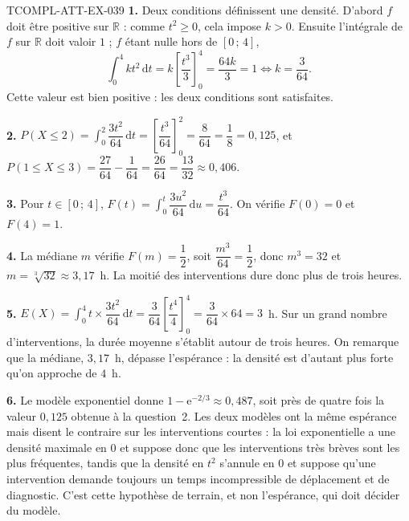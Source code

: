 \begin{corrige}{TCOMPL-ATT-EX-039}
\textbf{1.} Deux conditions définissent une densité. D'abord $f$ doit être
positive sur $\mathbb{R}$ : comme $t^2\geqslant 0$, cela impose $k>0$. Ensuite
l'intégrale de $f$ sur $\mathbb{R}$ doit valoir $1$ ; $f$ étant nulle hors de
$[0\,;\,4]$,
\[
  \int_0^4 k t^2\,\mathrm{d}t=k\left[\dfrac{t^3}{3}\right]_0^4=\dfrac{64k}{3}=1
  \iff k=\dfrac{3}{64}.
\]
Cette valeur est bien positive : les deux conditions sont satisfaites.

\textbf{2.} $P(X\leqslant 2)=\displaystyle\int_0^2\dfrac{3t^2}{64}\,\mathrm{d}t
=\left[\dfrac{t^3}{64}\right]_0^2=\dfrac{8}{64}=\dfrac18=0{,}125$, et
$P(1\leqslant X\leqslant 3)=\dfrac{27}{64}-\dfrac{1}{64}=\dfrac{26}{64}=\dfrac{13}{32}\approx 0{,}406$.

\textbf{3.} Pour $t\in[0\,;\,4]$,
$F(t)=\displaystyle\int_0^t\dfrac{3u^2}{64}\,\mathrm{d}u=\dfrac{t^3}{64}$. On
vérifie $F(0)=0$ et $F(4)=1$.

\textbf{4.} La médiane $m$ vérifie $F(m)=\dfrac12$, soit
$\dfrac{m^3}{64}=\dfrac12$, donc $m^3=32$ et $m=\sqrt[3]{32}\approx 3{,}17$~h.
La moitié des interventions dure donc plus de trois heures.

\textbf{5.} $E(X)=\displaystyle\int_0^4 t\times\dfrac{3t^2}{64}\,\mathrm{d}t
=\dfrac{3}{64}\left[\dfrac{t^4}{4}\right]_0^4=\dfrac{3}{64}\times 64=3$~h. Sur un
grand nombre d'interventions, la durée moyenne s'établit autour de trois heures.
On remarque que la médiane, $3{,}17$~h, dépasse l'espérance : la densité est
d'autant plus forte qu'on approche de $4$~h.

\textbf{6.} Le modèle exponentiel donne
$1-\mathrm{e}^{-2/3}\approx 0{,}487$, soit près de quatre fois la valeur
$0{,}125$ obtenue à la question~2. Les deux modèles ont la même espérance mais
disent le contraire sur les interventions courtes : la loi exponentielle a une
densité maximale en $0$ et suppose donc que les interventions très brèves sont
les plus fréquentes, tandis que la densité en $t^2$ s'annule en $0$ et suppose
qu'une intervention demande toujours un temps incompressible de déplacement et
de diagnostic. C'est cette hypothèse de terrain, et non l'espérance, qui doit
décider du modèle.
\end{corrige}
